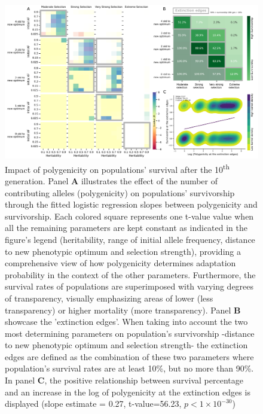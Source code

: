\documentclass{article}
\begin{document}
\begin{figure}[H]
  \centering
  \includegraphics[width=1\textwidth]{figures/poly_survivalship_value_edges.pdf}
  \caption{Impact of polygenicity on populations' survival after the 10\textsuperscript{th} generation. Panel \textbf{A} illustrates the effect of the number of contributing alleles (polygenicity) on populations' survivorship through the fitted logistic regression slopes between polygenicity and survivorship. Each colored square represents one t-value value when all the remaining parameters are kept constant as indicated in the figure's legend (heritability, range of initial allele frequency, distance to new phenotypic optimum and selection strength), providing a comprehensive view of how polygenicity determines adaptation probability in the context of the other parameters. Furthermore, the survival rates of populations are superimposed with varying degrees of transparency, visually emphasizing areas of lower (less transparency) or higher mortality (more transparency). Panel \textbf{B} showcase the 'extinction edges'. When taking into account the two most determining parameters on population's survivorship -distance to new phenotypic optimum and selection strength- the extinction edges are defined as the combination of these two parameters where population's survival rates are at least 10\%, but no more than 90\%. In panel \textbf{C}, the positive relationship between survival percentage and an increase in the log of polygenicity at the extinction edges is displayed (slope estimate = 0.27, t-value=56.23, $p<1 \times 10^{-30}$)}
  \label{fig:poly_panel_figure}
\end{figure}
\end{document}
